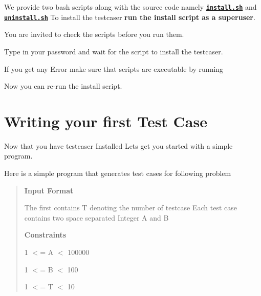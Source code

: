 We provide two bash scripts along with the source code namely 
\href{https://github.com/coder3101/testcaser/install.sh}{\texttt{ {\bfseries{install.\+sh}}}} and 
\href{https://github.com/coder3101/testcaser/install.sh}{\texttt{ {\bfseries{uninstall.\+sh}}}} To install the testcaser {\bfseries{run the install script as a superuser}}.

You are invited to check the scripts before you run them.


\begin{DoxyCode}{0}
\end{DoxyCode}


Type in your password and wait for the script to install the testcaser.

If you get any Error make sure that scripts are executable by running 
\begin{DoxyCode}{0}
\end{DoxyCode}


Now you can re-\/run the install script.\hypertarget{index_started}{}\section{Writing your first Test Case}\label{index_started}
Now that you have testcaser Installed Let\textquotesingle{}s get you started with a simple program.

Here is a simple program that generates test cases for following problem \begin{quote}
{\bfseries{Input Format}}

The first contains T denoting the number of testcase Each test case contains two space separated Integer A and B

{\bfseries{Constraints}}

1 $<$= A $<$ 100000

1 $<$= B $<$ 100

1 $<$= T $<$ 10 \end{quote}



